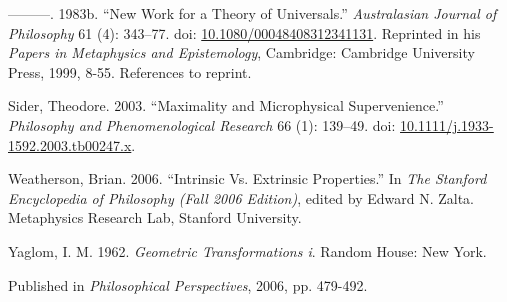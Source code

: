 \documentclass[
  11pt,
  letterpaper,
  DIV=11,
  numbers=noendperiod,
  twoside]{scrartcl}
\newlength{\cslhangindent}
\newenvironment{CSLReferences}[2] %
 {\begin{list}{}{%
  \setlength{\itemindent}{0pt}
  \setlength{\leftmargin}{0pt}
  \setlength{\parsep}{0pt}
  \ifodd #1
   \setlength{\leftmargin}{\cslhangindent}
   \setlength{\itemindent}{-1\cslhangindent}
  \fi
  \setlength{\itemsep}{#2\baselineskip}}}
 {\end{list}}
\begin{document}
\begin{CSLReferences}{1}{0}
---------. 1983b. {``New Work for a Theory of Universals.''}
\emph{Australasian Journal of Philosophy} 61 (4): 343--77. doi:
\href{https://doi.org/10.1080/00048408312341131}{10.1080/00048408312341131}.
Reprinted in his \emph{Papers in Metaphysics and Epistemology},
Cambridge: Cambridge University Press, 1999, 8-55. References to
reprint.

Sider, Theodore. 2003. {``Maximality and Microphysical Supervenience.''}
\emph{Philosophy and Phenomenological Research} 66 (1): 139--49. doi:
\href{https://doi.org/10.1111/j.1933-1592.2003.tb00247.x}{10.1111/j.1933-1592.2003.tb00247.x}.

Weatherson, Brian. 2006. {``{Intrinsic Vs. Extrinsic Properties}.''} In
\emph{The Stanford Encyclopedia of Philosophy (Fall 2006 Edition)},
edited by Edward N. Zalta. Metaphysics Research Lab, Stanford
University.

Yaglom, I. M. 1962. \emph{Geometric Transformations i}. Random House:
New York.

\end{CSLReferences}



\noindent Published in\emph{
Philosophical Perspectives}, 2006, pp. 479-492.
\end{document}
